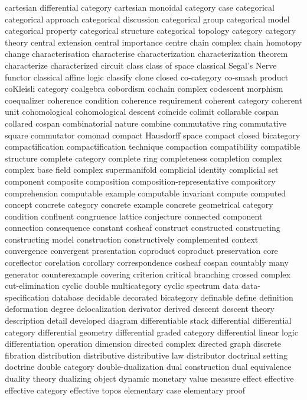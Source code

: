 cartesian differential category
cartesian monoidal category
case
categorical
categorical approach
categorical discussion
categorical group
categorical model
categorical property
categorical structure
categorical topology
category
category theory
central extension
central importance
centre
chain complex
chain homotopy
change
characterisation
characterise
characterization
characterization theorem
characterize
characterized
circuit
class
class of space
classical Segal's Nerve functor
classical affine logic
classify
clone
closed
co-category
co-smash product
coKleisli category
coalgebra
cobordism
cochain complex
codescent morphism
coequalizer
coherence condition
coherence requirement
coherent category
coherent unit
cohomological
cohomological descent
coincide
colimit
collarable cospan
collared cospan
combinatorial nature
combine
commutative ring
commutative square
commutator
comonad
compact Hausdorff space
compact closed bicategory
compactification
compactification technique
compaction
compatibility
compatible structure
complete category
complete ring
completeness
completion
complex
complex base field
complex supermanifold
complicial identity
complicial set
component
composite
composition
composition-representative
compository
comprehension
computable example
computable invariant
compute
computed
concept
concrete category
concrete example
concrete geometrical category
condition
confluent
congruence lattice
conjecture
connected component
connection
consequence
constant cosheaf
construct
constructed
constructing
constructing model
construction
constructively complemented
context
convergence
convergent presentation
coproduct
coproduct preservation
core
coreflector
corelation
corollary
correspondence
cosheaf
cospan
countably many generator
counterexample
covering
criterion
critical branching
crossed complex
cut-elimination
cyclic double multicategory
cyclic spectrum
data
data-specification
database
decidable
decorated bicategory
definable
define
definition
deformation
degree
delocalization
derivator
derived
descent
descent theory
description
detail
developed
diagram
differentiable stack
differential
differential category
differential geometry
differential graded category
differential linear logic
differentiation operation
dimension
directed complex
directed graph
discrete fibration
distribution
distributive
distributive law
distributor
doctrinal setting
doctrine
double category
double-dualization
dual construction
dual equivalence
duality theory
dualizing object
dynamic monetary value measure
effect
effective
effective category
effective topos
elementary case
elementary proof
